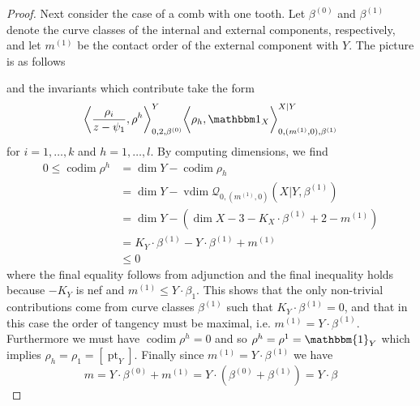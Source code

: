 \documentclass[11pt]{amsart}
\newcommand{\Q}[4]{\mathcal{Q}_{#1,#2}(#3,#4)}
\newcommand{\pt}{\operatorname{pt}}
\newcommand{\codim}{\operatorname{codim}}
\newcommand{\vdim}{\operatorname{vdim}}
\theoremstyle{definition}
\theoremstyle{definition}
\begin{document}
\begin{proof}
Next consider the case of a comb with one tooth. Let $\beta^{(0)}$ and $\beta^{(1)}$ denote the curve classes of the internal and external components, respectively, and let $m^{(1)}$ be the contact order of the external component with $Y$. The picture is as follows
\begin{center}
\end{center}
and the invariants which contribute take the form
\begin{equation*} \bigg\langle \dfrac{\rho_i}{z-\psi_1},\rho^h\bigg\rangle_{0,2,\beta^{(0)}}^Y \bigg\langle \rho_h, \mathbbm 1_{X}\bigg\rangle_{0,(m^{(1)},0),\beta^{(1)}}^{X|Y} \end{equation*}
for $i = 1, \ldots, k$ and $h = 1, \ldots, l$. By computing dimensions, we find
\begin{align*}
0\leq \codim \rho^h &= \dim Y-\codim \rho_h \\
&= \dim Y-\vdim \Q{0}{(m^{(1)},0)}{X|Y}{\beta^{(1)}} \\
&= \dim Y-(\dim X-3-K_{X}\cdot \beta^{(1)}+2-m^{(1)})\\
&= K_Y \cdot \beta^{(1)} - Y \cdot \beta^{(1)}+m^{(1)} \\
&\leq 0
\end{align*}
where the final equality follows from adjunction and the final inequality holds because $-K_Y$ is nef and $m^{(1)}\leq Y \cdot \beta_1$. This shows that the only non-trivial contributions come from curve classes $\beta^{(1)}$ such that $K_Y \cdot \beta^{(1)}=0$, and that in this case the order of tangency must be maximal, i.e. $m^{(1)}=Y \cdot \beta^{(1)}$. Furthermore we must have $\codim \rho^h = 0$ and so $\rho^h = \rho^1 = \mathbbm{1}_Y$ which implies $\rho_h = \rho_1 = [\pt_Y]$. Finally since $m^{(1)}=Y \cdot \beta^{(1)}$ we have
\begin{equation*} m = Y \cdot \beta^{(0)}+m^{(1)}=Y \cdot (\beta^{(0)} + \beta^{(1)}) = Y \cdot \beta \end{equation*}

\end{proof}
\end{document}
